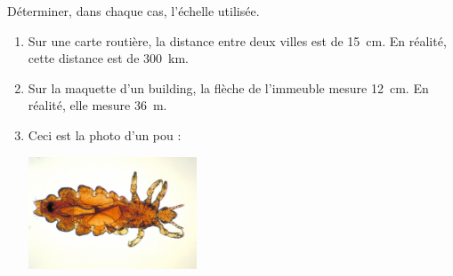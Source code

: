 
\begin{exercice}\label{exo2smath-0126}

Déterminer, dans chaque cas, l'échelle utilisée.
\begin{enumerate}
    \item
 Sur une carte routière, la distance entre deux villes est de \SI{15}{\centi\meter}. En réalité, cette distance est de \SI{300}{\kilo\meter}.
\item
    Sur la maquette d’un building, la flèche de l'immeuble mesure \SI{12}{\centi\meter}. En réalité, elle mesure \SI{36}{\meter}.
\item
    Ceci est la photo d'un pou\cite{OUDMooPWBllL} :
    \begin{center}
 \includegraphics[width=5cm]{Pediculus_humanus.pdf}
    \end{center}

\end{enumerate}

\end{exercice}
